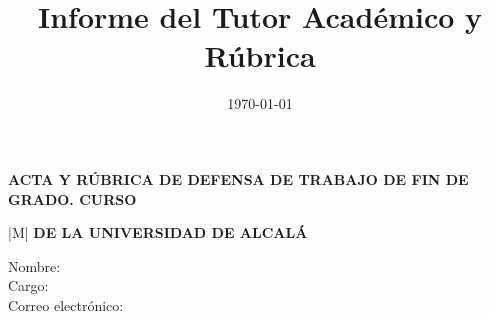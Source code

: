 \documentclass[10pt,a4paper,oneside]{article}
\title{Informe del Tutor Académico y Rúbrica}  %
\date{\today}                                  %
\author{\myAcademicTutorFullName}              %
\begin{document}
%
%




\newpage

\thispagestyle{plain}

\noindent \textbf{\small ACTA Y RÚBRICA DE DEFENSA DE TRABAJO DE FIN DE GRADO. CURSO \myThesisAcademicYear}

\vspace{0.5cm}


\noindent
\begin{tabular}{|M{\textwidth}|}
\hline
\textbf{\small \MakeUppercase{\wordTutorOrTutora} \MakeUppercase{\wordAcademicoOrAcademica} DE LA UNIVERSIDAD DE ALCALÁ}\vspace*{-5pt}\\
\hline
\end{tabular}



\begin{description}
  \item[Nombre:] \myAcademicTutorFullName
  \item[Cargo:] \myAcademicTutorPosition
  \item[Correo electrónico:] \myAcademicTutorEmail
\end{description}

\vspace{0.25cm}
\end{document}
